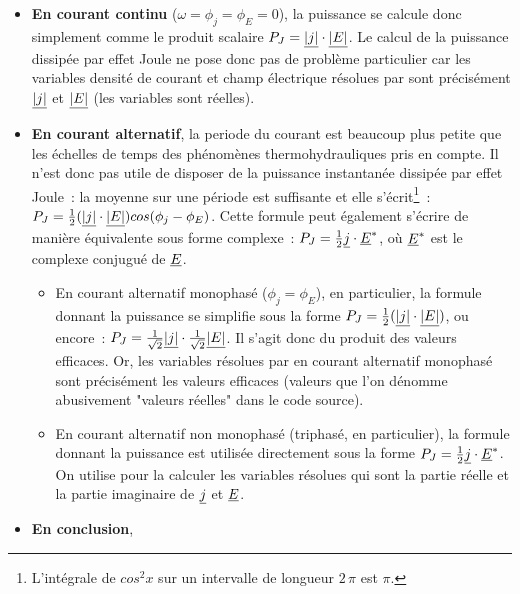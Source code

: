 \begin{itemize}

\item {\bf En courant continu} ($\omega=\phi_j=\phi_E=0$),
la puissance se calcule donc simplement comme
le produit scalaire $P_J=\underline{|j|}\cdot\underline{|E|}$.
Le calcul de la puissance
dissipée par effet Joule ne pose donc pas de problème particulier
car les variables densité de courant et champ électrique résolues
par \CS sont précisément $\underline{|j|}$ et $\underline{|E|}$ (les variables sont réelles).

\item {\bf En courant alternatif}, la periode du courant est beaucoup plus petite que
les échelles de temps des phénomènes thermohydrauliques pris en compte.
Il n'est donc pas utile de disposer de la puissance instantanée dissipée
par effet Joule~: la moyenne sur une période est suffisante et elle
s'écrit\footnote{L'intégrale de $cos^2 x$ sur un intervalle de longueur
$2\,\pi$ est $\pi$.}~:
$P_J=\frac{1}{2}(\underline{|j|}\cdot\underline{|E|})cos(\phi_j-\phi_E)$. Cette formule
peut également s'écrire de manière équivalente sous forme complexe~:
$P_J=\frac{1}{2}\underline{j}\cdot\underline{E}^*$, où $\underline{E}^*$ est le complexe
conjugué de $\underline{E}$.

  \begin{itemize}
  \item En courant alternatif monophasé ($\phi_j=\phi_E$), en particulier,
la formule donnant la puissance se simplifie sous la forme
$P_J=\frac{1}{2}(\underline{|j|}\cdot\underline{|E|})$, ou encore~:
$P_J=\frac{1}{\sqrt{2}}\underline{|j|}\cdot\frac{1}{\sqrt{2}}\underline{|E|}$.
Il s'agit donc du produit des valeurs efficaces. Or, les variables résolues
par \CS en courant alternatif monophasé sont précisément les
valeurs efficaces (valeurs que l'on
dénomme abusivement "valeurs réelles" dans le code source).

  \item En courant alternatif non monophasé (triphasé, en particulier),
la formule donnant la puissance est utilisée directement sous la forme
$P_J=\frac{1}{2}\underline{j}\cdot\underline{E}^*$.
On utilise pour la calculer les variables résolues qui sont
la partie réelle et la partie imaginaire de $\underline{j}$ et $\underline{E}$.

  \end{itemize}

\item {\bf En conclusion},


\end{itemize}
